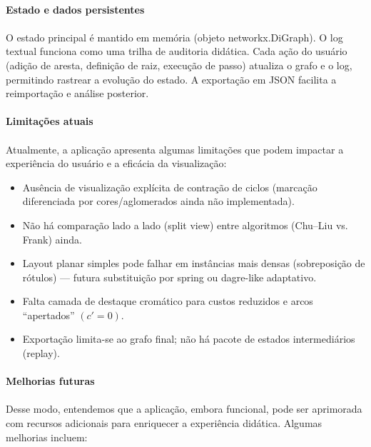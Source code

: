 \documentclass[12pt,a4paper]{article}
\def\texttt#1{#1}%
\def\emph#1{#1}%
\begin{document}
\paragraph{Estado e dados persistentes}
\paragraph{}
O estado principal é mantido em memória (objeto \texttt{networkx.DiGraph}). O log textual funciona como uma \emph{trilha de auditoria didática}. Cada ação do usuário (adição de aresta, definição de raiz, execução de passo) atualiza o grafo e o log, permitindo rastrear a evolução do estado. A exportação em JSON facilita a reimportação e análise posterior.

\paragraph{Limitações atuais}
\paragraph{}
Atualmente, a aplicação apresenta algumas limitações que podem impactar a experiência do usuário e a eficácia da visualização:

\begin{itemize}\setlength{\itemsep}{2pt}
    \item Ausência de visualização explícita de contração de ciclos (marcação diferenciada por cores/aglomerados ainda não implementada).
    \item Não há comparação lado a lado (split view) entre algoritmos (Chu--Liu vs. Frank) ainda.
    \item Layout planar simples pode falhar em instâncias mais densas (sobreposição de rótulos) — futura substituição por \texttt{spring} ou \texttt{dagre}-like adaptativo.
    \item Falta camada de destaque cromático para custos reduzidos e arcos “apertados” \((c' = 0)\).
    \item Exportação limita-se ao grafo final; não há pacote de estados intermediários (\emph{replay}).
\end{itemize}

\paragraph{Melhorias futuras}
\paragraph{}
Desse modo, entendemos que a aplicação, embora funcional, pode ser aprimorada com recursos adicionais para enriquecer a experiência didática. Algumas melhorias incluem:
\end{document}
